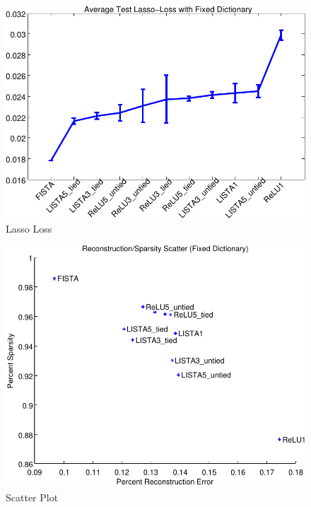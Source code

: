 \begin{figure}
\centering
\includegraphics[scale=0.75]{./figures/LISTA/fixed_decoder_loss.pdf}
\caption{Lasso Loss} 
\label{fig:LISTA} 
\end{figure}  

\begin{figure}
\centering
\includegraphics[scale=0.75]{./figures/LISTA/fixed_decoder_scatter.pdf}
\caption{Scatter Plot} 
\label{fig:LISTA} 
\end{figure}  

